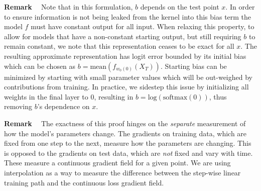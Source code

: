 
\textbf{Remark ~} Note that in this formulation, $b$ depends on the test point $x$.
In order to ensure information is not being leaked from the kernel into this bias term the model $f$ must have constant output for all input. 
When relaxing this property, to allow for models that have a non-constant starting output, but still requiring $b$ to remain constant, we note that this representation ceases to be exact for all $x$.
The resulting approximate representation has logit error bounded by its initial bias which can be chosen as $b = \text{mean}(f_{w_0(0)}(X_T))$.
Starting bias can be minimized by starting with small parameter values which will be out-weighed by contributions from training.
In practice, we sidestep this issue by initializing all weights in the final layer to $0$, resulting in $b=\text{log}(\text{softmax}(0))$, thus removing $b$'s dependence on $x$.

\textbf{Remark ~} 
The exactness of this proof hinges on the \emph{separate} measurement of how the model's parameters change.
The gradients on training data, which are fixed from one step to the next, measure how the parameters are changing.
This is opposed to the gradients on test data, which are \textit{not} fixed and vary with time.
These measure a continuous gradient field for a given point.
We are using interpolation as a way to measure the difference between the step-wise linear training path and the continuous loss gradient field. 

